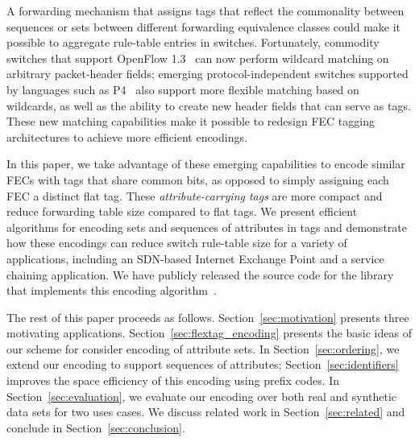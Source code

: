 A forwarding mechanism that assigns tags that reflect the commonality
between sequences or sets between different forwarding equivalence
classes could make it possible to aggregate rule-table entries in
switches.  Fortunately, commodity switches that support OpenFlow
1.3~\cite{of13} can now perform wildcard matching on arbitrary
packet-header fields; emerging protocol-independent switches supported
by languages such as P4~\cite{P4} also support more flexible matching
based on wildcards, as well as the ability to create new header fields
that can serve as tags. These new matching capabilities make it
possible to redesign FEC tagging architectures to achieve more
efficient encodings.

In this paper, we take advantage of these emerging capabilities to
encode similar FECs with tags that share common bits, as opposed to
simply assigning each FEC a distinct flat tag.  These
\emph{attribute-carrying tags} are more compact and reduce forwarding
table size compared to flat tags. We present efficient algorithms for
encoding sets and sequences of attributes in tags and demonstrate how
these encodings can reduce switch rule-table size for a variety of
applications, including an SDN-based Internet Exchange Point and a
service chaining application. We have publicly released the source
code for the library that implements this encoding algorithm~\cite{rsets-repo}.

The rest of this paper proceeds as
follows. Section~\ref{sec:motivation} presents three motivating
applications. Section~\ref{sec:flextag_encoding}
presents the basic ideas of our scheme for consider encoding of
attribute sets. In Section~\ref{sec:ordering}, we extend our encoding
to support sequences of attributes; Section~\ref{sec:identifiers}
improves the space efficiency of this encoding using prefix codes. In
Section~\ref{sec:evaluation}, we evaluate our encoding over both real
and synthetic data sets for two uses cases. We discuss related work in
Section~\ref{sec:related} and conclude in
Section~\ref{sec:conclusion}.


